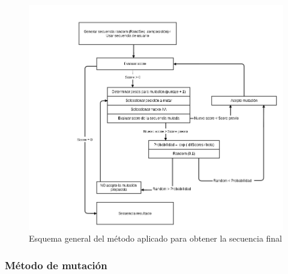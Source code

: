 \begin{figure}[htbp]
\centering
   \includegraphics[width=\textwidth]{img/diagrama-algoritmo.png}
 \caption{Esquema general del método aplicado para obtener la secuencia final}
 \label{fig:esquema-algoritmo}
\end{figure}



\subsubsection{Método de mutación}

